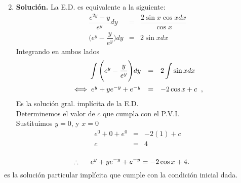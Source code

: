 \documentclass{beamer}
\begin{document}
\begin{frame}[t]
	\begin{enumerate}
			\setcounter{enumi}{1}
		\item \textbf{Solución.} La E.D. es equivalente a la siguiente:
			\[
				\begin{array}{rcl}
					\dfrac{e^{2y} -y}{e^y} dy & = & \dfrac{2 \sin x \cos x dx}{\cos x} \\[2mm]
					\Bigg(e^y- \dfrac{y}{e^y}\Bigg) dy & = & 2 \sin x dx
				\end{array}
			\]
			Integrando en ambos lados
			\[
				\begin{array}{rcl}
					\displaystyle\int \Bigg(e^y- \dfrac{y}{e^y}\Bigg) dy & = & 2 \displaystyle\int \sin xdx \\[5mm]
					\iff e^y+ye^{-y}+ e^{-y} & = & -2 \cos x+c\;\;,
				\end{array}
			\]
			Es la solución gral. implícita de la E.D.\\
			Determinemos el valor de \(c\) que cumpla con el P.V.I.\\
			Sustituimos \(y=0\), y \(x=0\)
			\[
				\begin{array}{rcl}
					e^0+0+e^0&=&-2(1) +c \\[2mm]
					c & = & 4 \\[2mm]
				\end{array}
			\]
	\end{enumerate}
\end{frame}

\begin{frame}[t]
	\[
		\therefore \hspace{5mm} e^y+ye^{-y} +e^{-y} = -2 \cos x+4.
	\]
	es la solución particular implícita que cumple con la condición inicial dada.
\end{frame}
\end{document}
